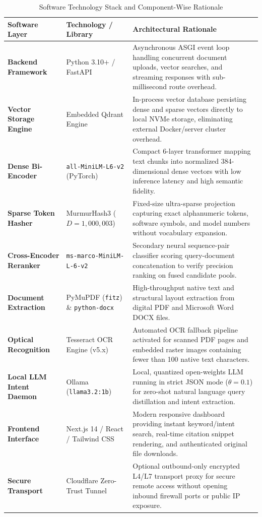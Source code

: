 \documentclass[a4paper,12pt]{article}
\begin{document}
\begin{table}[H]
\centering
\small
\renewcommand{\arraystretch}{1.2}
\setlength{\tabcolsep}{5pt}
\begin{tabularx}{\textwidth}{|p{2.8cm}|p{4.2cm}|X|}
\hline
\rowcolor{gray!15} \textbf{Software Layer} & \textbf{Technology / Library} & \textbf{Architectural Rationale} \\ \hline
\textbf{Backend Framework} & Python 3.10+ / FastAPI & Asynchronous ASGI event loop handling concurrent document uploads, vector searches, and streaming responses with sub-millisecond route overhead. \\ \hline
\textbf{Vector Storage Engine} & Embedded Qdrant Engine & In-process vector database persisting dense and sparse vectors directly to local NVMe storage, eliminating external Docker/server cluster overhead. \\ \hline
\textbf{Dense Bi-Encoder} & \texttt{all-MiniLM-L6-v2} (PyTorch) & Compact 6-layer transformer mapping text chunks into normalized 384-dimensional dense vectors with low inference latency and high semantic fidelity. \\ \hline
\textbf{Sparse Token Hasher} & MurmurHash3 ($D=1,000,003$) & Fixed-size ultra-sparse projection capturing exact alphanumeric tokens, software symbols, and model numbers without vocabulary expansion. \\ \hline
\textbf{Cross-Encoder Reranker} & \texttt{ms-marco-MiniLM-L-6-v2} & Secondary neural sequence-pair classifier scoring query-document concatenation to verify precision ranking on fused candidate pools. \\ \hline
\textbf{Document Extraction} & PyMuPDF (\texttt{fitz}) \& \texttt{python-docx} & High-throughput native text and structural layout extraction from digital PDF and Microsoft Word DOCX files. \\ \hline
\textbf{Optical Recognition} & Tesseract OCR Engine (v5.x) & Automated OCR fallback pipeline activated for scanned PDF pages and embedded raster images containing fewer than 100 native text characters. \\ \hline
\textbf{Local LLM Intent Daemon} & Ollama (\texttt{llama3.2:1b}) & Local, quantized open-weights LLM running in strict JSON mode ($\theta=0.1$) for zero-shot natural language query distillation and intent extraction. \\ \hline
\textbf{Frontend Interface} & Next.js 14 / React / Tailwind CSS & Modern responsive dashboard providing instant keyword/intent search, real-time citation snippet rendering, and authenticated original file downloads. \\ \hline
\textbf{Secure Transport} & Cloudflare Zero-Trust Tunnel & Optional outbound-only encrypted L4/L7 transport proxy for secure remote access without opening inbound firewall ports or public IP exposure. \\ \hline
\end{tabularx}
\caption{Software Technology Stack and Component-Wise Rationale}
\label{tab:software_stack}
\end{table}
\end{document}
